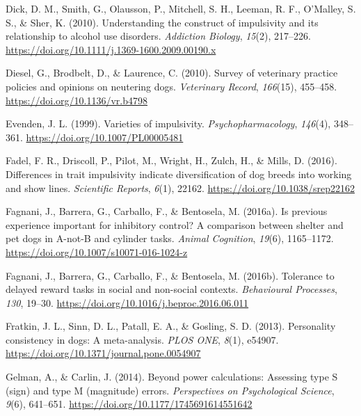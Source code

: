 \documentclass[
  ,pub,floatsintext]{apa6}
\newlength{\cslhangindent}
\newlength{\cslentryspacingunit} %
\newenvironment{CSLReferences}[2] %
 {%
  \setlength{\parindent}{0pt}
  \ifodd #1
  \let\oldpar\par
  \def\par{\hangindent=\cslhangindent\oldpar}
  \fi
  \setlength{\parskip}{#2\cslentryspacingunit}
 }%
 {}
\begin{document}
\begin{CSLReferences}{1}{0}
\leavevmode{}%
Dick, D. M., Smith, G., Olausson, P., Mitchell, S. H., Leeman, R. F., O'Malley, S. S., \& Sher, K. (2010). Understanding the construct of impulsivity and its relationship to alcohol use disorders. \emph{Addiction Biology}, \emph{15}(2), 217--226. \url{https://doi.org/10.1111/j.1369-1600.2009.00190.x}

\leavevmode{}%
Diesel, G., Brodbelt, D., \& Laurence, C. (2010). Survey of veterinary practice policies and opinions on neutering dogs. \emph{Veterinary Record}, \emph{166}(15), 455--458. \url{https://doi.org/10.1136/vr.b4798}

\leavevmode{}%
Evenden, J. L. (1999). Varieties of impulsivity. \emph{Psychopharmacology}, \emph{146}(4), 348--361. \url{https://doi.org/10.1007/PL00005481}

\leavevmode{}%
Fadel, F. R., Driscoll, P., Pilot, M., Wright, H., Zulch, H., \& Mills, D. (2016). Differences in trait impulsivity indicate diversification of dog breeds into working and show lines. \emph{Scientific Reports}, \emph{6}(1), 22162. \url{https://doi.org/10.1038/srep22162}

\leavevmode{}%
Fagnani, J., Barrera, G., Carballo, F., \& Bentosela, M. (2016a). Is previous experience important for inhibitory control? {A} comparison between shelter and pet dogs in {A-not-B} and cylinder tasks. \emph{Animal Cognition}, \emph{19}(6), 1165--1172. \url{https://doi.org/10.1007/s10071-016-1024-z}

\leavevmode{}%
Fagnani, J., Barrera, G., Carballo, F., \& Bentosela, M. (2016b). Tolerance to delayed reward tasks in social and non-social contexts. \emph{Behavioural Processes}, \emph{130}, 19--30. \url{https://doi.org/10.1016/j.beproc.2016.06.011}

\leavevmode{}%
Fratkin, J. L., Sinn, D. L., Patall, E. A., \& Gosling, S. D. (2013). Personality consistency in dogs: {A} meta-analysis. \emph{PLOS ONE}, \emph{8}(1), e54907. \url{https://doi.org/10.1371/journal.pone.0054907}

\leavevmode{}%
Gelman, A., \& Carlin, J. (2014). Beyond power calculations: {Assessing} type {S} (sign) and type {M} (magnitude) errors. \emph{Perspectives on Psychological Science}, \emph{9}(6), 641--651. \url{https://doi.org/10.1177/1745691614551642}


\end{CSLReferences}
\end{document}
